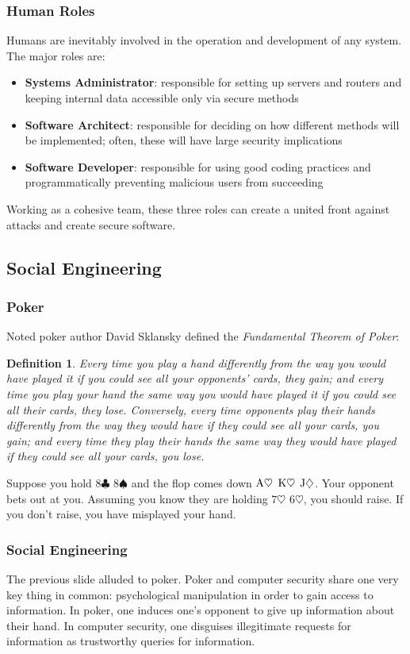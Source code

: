\documentclass[aspectratio=169]{beamer}
\newtheorem{defn}{Definition}
\begin{document}
\begin{frame}
\frametitle{Human Roles}
Humans are inevitably involved in the operation and development of any system. The major roles are:
\begin{itemize}
	\item \textbf{Systems Administrator}: responsible for setting up servers and routers and keeping internal data accessible only via secure methods
	\item \textbf{Software Architect}: responsible for deciding on how different methods will be implemented; often, these will have large security implications
	\item \textbf{Software Developer}: responsible for using good coding practices and programmatically preventing malicious users from succeeding
\end{itemize}
Working as a cohesive team, these three roles can create a united front against attacks and create secure software.
\end{frame}

\subsection{Social Engineering}
\begin{frame}
\frametitle{Poker}
Noted poker author David Sklansky defined the \emph{Fundamental Theorem of Poker}: \cite{sklansky}
\begin{defn}
	Every time you play a hand differently from the way you would have played it if you could see all your opponents' cards, they gain; and every time you play your hand the same way you would have played it if you could see all their cards, they lose. Conversely, every time opponents play their hands differently from the way they would have if they could see all your cards, you gain; and every time they play their hands the same way they would have played if they could see all your cards, you lose.
\end{defn}
Suppose you hold $8 \clubsuit$ $8 \spadesuit$ and the flop comes down {\color{red} $\textnormal{A} \heartsuit$ $\textnormal{K} \heartsuit$ $\textnormal{J} \diamondsuit$}. Your opponent bets out at you. Assuming you know they are holding {\color{red} $7 \heartsuit$ $6 \heartsuit$}, you should raise. If you don't raise, you have misplayed your hand.
\end{frame}

\begin{frame}
\frametitle{Social Engineering}
The previous slide alluded to poker. Poker and computer security share one very key thing in common: psychological manipulation in order to gain access to information. In poker, one induces one's opponent to give up information about their hand. In computer security, one disguises illegitimate requests for information as trustworthy queries for information.
\end{frame}
\end{document}
